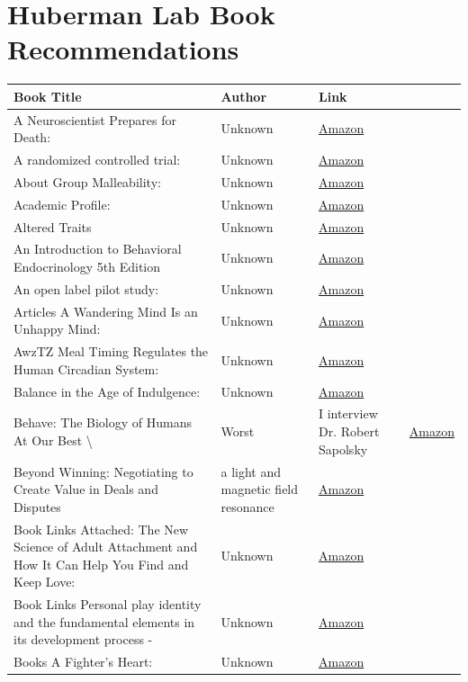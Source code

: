 \documentclass{article}
\begin{document}
\section{Huberman Lab Book Recommendations}

\begin{longtable}{|p{8cm}|p{4cm}|p{2.5cm}|}
\hline
\textbf{Book Title} & \textbf{Author} & \textbf{Link} \\
\hline
A Neuroscientist Prepares for Death: & Unknown & \href{https://amzn.to/3slCpRl}{Amazon} \\
\hline
A randomized controlled trial: & Unknown & \href{https://amzn.to/3NkQ2qg}{Amazon} \\
\hline
About Group Malleability: & Unknown & \href{https://amzn.to/3VXPFIo}{Amazon} \\
\hline
Academic Profile: & Unknown & \href{https://amzn.to/4fsvRDC}{Amazon} \\
\hline
Altered Traits & Unknown & \href{https://amzn.to/3wXsKj8}{Amazon} \\
\hline
An Introduction to Behavioral Endocrinology 5th Edition & Unknown & \href{https://amzn.to/396bHm9}{Amazon} \\
\hline
An open label pilot study: & Unknown & \href{https://amzn.to/3fVqbIG}{Amazon} \\
\hline
Articles
A Wandering Mind Is an Unhappy Mind: & Unknown & \href{https://amzn.to/42nMx9H}{Amazon} \\
\hline
AwzTZ
Meal Timing Regulates the Human Circadian System: & Unknown & \href{https://amzn.to/3dfsncH}{Amazon} \\
\hline
Balance in the Age of Indulgence: & Unknown & \href{https://amzn.to/3E3Und5}{Amazon} \\
\hline
Behave: The Biology of Humans At Our Best \textbackslash{}& Worst & I interview Dr. Robert Sapolsky & \href{https://amzn.to/3yrZ6k7}{Amazon} \\
\hline
Beyond Winning: Negotiating to Create Value in Deals and Disputes & a light and magnetic field resonance & \href{https://amzn.to/3uSBjOd}{Amazon} \\
\hline
Book Links
Attached: The New Science of Adult Attachment and How It Can Help You Find and Keep Love: & Unknown & \href{https://amzn.to/3HJjXVs}{Amazon} \\
\hline
Book Links
Personal play identity and the fundamental elements in its development process - & Unknown & \href{https://amzn.to/3uLnC1B}{Amazon} \\
\hline
Books
A Fighter's Heart: & Unknown & \href{https://amzn.to/3PUtmQ2}{Amazon} \\

\end{longtable}
\end{document}
